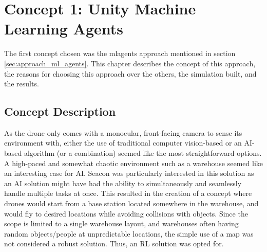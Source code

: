 \chapter{Concept 1: Unity Machine Learning Agents}
\label{ch:concept_one}
The first concept chosen was the \gls{mlagents} approach mentioned in section \ref{sec:approach_ml_agents}. This chapter describes the concept of this approach, the reasons for choosing this approach over the others, the simulation built, and the results.

\section{Concept Description}
As the drone only comes with a monocular, front-facing camera to sense its environment with, either the use of traditional computer vision-based or an \gls{AI}-based algorithm (or a combination) seemed like the most straightforward options. A high-paced and somewhat chaotic environment such as a warehouse seemed like an interesting case for \gls{AI}. Seacon was particularly interested in this solution as an \gls{AI} solution might have had the ability to simultaneously and seamlessly handle multiple tasks at once. This resulted in the creation of a concept where drones would start from a base station located somewhere in the warehouse, and would fly to desired locations while avoiding collisions with objects. Since the scope is limited to a single warehouse layout, and warehouses often having random objects/people at unpredictable locations, the simple use of a map was not considered a robust solution. Thus, an \gls{RL} solution was opted for.

